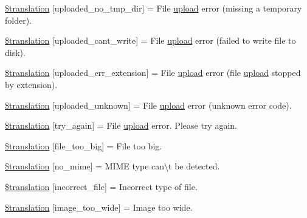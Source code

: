 \begin{DoxyCompactItemize}
\hyperlink{class_8upload_8xx___x_x_8php_ae3cdc68fe248399f77246c91b0555341}{\$translation} \mbox{[}\textquotesingle{}uploaded\+\_\+no\+\_\+tmp\+\_\+dir\textquotesingle{}\mbox{]} = \textquotesingle{}File \hyperlink{classupload}{upload} error (missing a temporary folder).\textquotesingle{}
\item 
\hyperlink{class_8upload_8xx___x_x_8php_af368fee3b41bc05e6b208c1557a00c00}{\$translation} \mbox{[}\textquotesingle{}uploaded\+\_\+cant\+\_\+write\textquotesingle{}\mbox{]} = \textquotesingle{}File \hyperlink{classupload}{upload} error (failed to write file to disk).\textquotesingle{}
\item 
\hyperlink{class_8upload_8xx___x_x_8php_a01c69a4c8556602b3892dce727bace11}{\$translation} \mbox{[}\textquotesingle{}uploaded\+\_\+err\+\_\+extension\textquotesingle{}\mbox{]} = \textquotesingle{}File \hyperlink{classupload}{upload} error (file \hyperlink{classupload}{upload} stopped by extension).\textquotesingle{}
\item 
\hyperlink{class_8upload_8xx___x_x_8php_a4a9168e922b827e6a28b5db1c00774ca}{\$translation} \mbox{[}\textquotesingle{}uploaded\+\_\+unknown\textquotesingle{}\mbox{]} = \textquotesingle{}File \hyperlink{classupload}{upload} error (unknown error code).\textquotesingle{}
\item 
\hyperlink{class_8upload_8xx___x_x_8php_a3afc377bd803683314f413a814243066}{\$translation} \mbox{[}\textquotesingle{}try\+\_\+again\textquotesingle{}\mbox{]} = \textquotesingle{}File \hyperlink{classupload}{upload} error. Please try again.\textquotesingle{}
\item 
\hyperlink{class_8upload_8xx___x_x_8php_a476278eb4a0c3df56af068e2d511a741}{\$translation} \mbox{[}\textquotesingle{}file\+\_\+too\+\_\+big\textquotesingle{}\mbox{]} = \textquotesingle{}File too big.\textquotesingle{}
\item 
\hyperlink{class_8upload_8xx___x_x_8php_a191a55df8e3bb7f3c51b70f3c1932e02}{\$translation} \mbox{[}\textquotesingle{}no\+\_\+mime\textquotesingle{}\mbox{]} = \textquotesingle{}M\+I\+M\+E type can\textbackslash{}\textquotesingle{}t be detected.\textquotesingle{}
\item 
\hyperlink{class_8upload_8xx___x_x_8php_a4d32343e2699edd6fd435f9c832cb9c7}{\$translation} \mbox{[}\textquotesingle{}incorrect\+\_\+file\textquotesingle{}\mbox{]} = \textquotesingle{}Incorrect type of file.\textquotesingle{}
\item 
\hyperlink{class_8upload_8xx___x_x_8php_a0dd3e4930ca1f59ae280f4b1006525cd}{\$translation} \mbox{[}\textquotesingle{}image\+\_\+too\+\_\+wide\textquotesingle{}\mbox{]} = \textquotesingle{}Image too wide.\textquotesingle{}

\end{DoxyCompactItemize}
